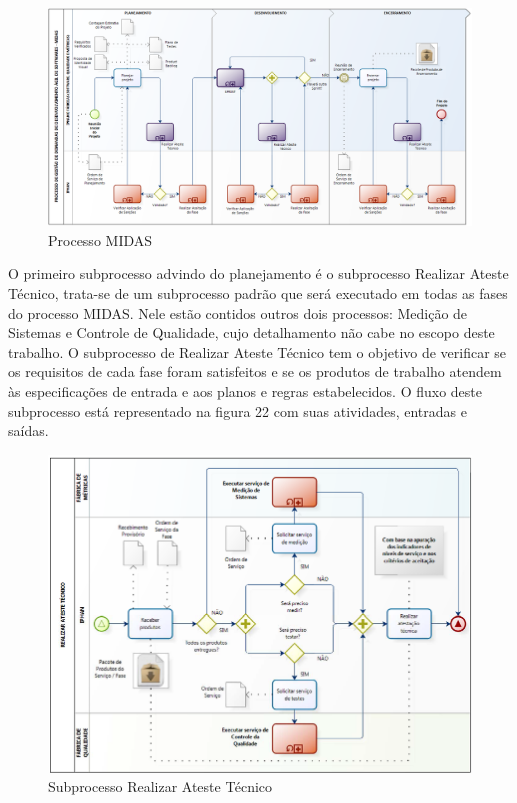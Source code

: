 \begin{anexosenv}
\begin{figure}[H]
		\centering
		\label{fig01}
			\includegraphics[scale=0.3]{figuras/processoMIDAS.png}
		\caption{Processo MIDAS \cite{IPHAN:2013}}
\end{figure}

O primeiro subprocesso advindo do planejamento é o subprocesso Realizar Ateste Técnico, trata-se de um subprocesso padrão que será executado em todas as fases do processo MIDAS. Nele estão contidos outros dois processos: Medição de Sistemas e Controle de Qualidade, cujo detalhamento não cabe no escopo deste trabalho. O subprocesso de Realizar Ateste Técnico tem o objetivo de verificar se os requisitos de cada fase foram satisfeitos e se os produtos de trabalho atendem às especificações de entrada e aos planos e regras estabelecidos. O fluxo deste subprocesso está representado na figura 22 com suas atividades, entradas e saídas.

\begin{figure}[H]
		\centering
		\label{fig01}
			\includegraphics[scale=0.7]{figuras/subprocessoAteste.png}
		\caption{Subprocesso Realizar Ateste Técnico \cite{IPHAN:2013}}
\end{figure}


\end{anexosenv}
